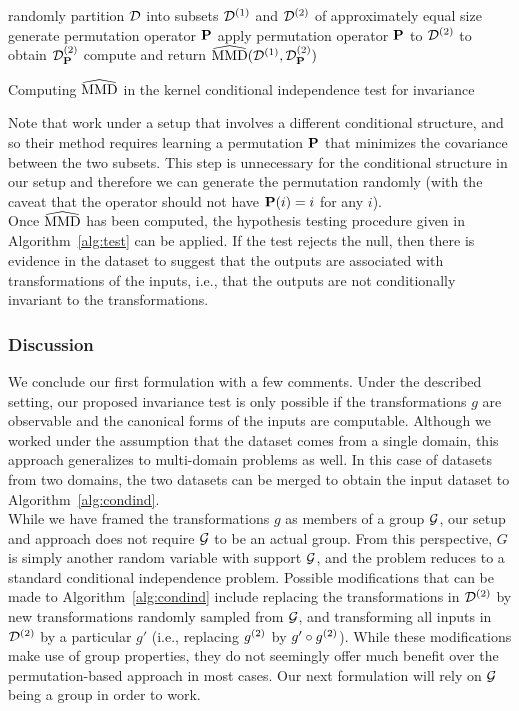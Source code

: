 \begin{algorithm}[H]
\SetAlgoLined
{}
\BlankLine
randomly partition $\mathcal{D}$ into subsets $\mathcal{D}^{(1)}$ and $\mathcal{D}^{(2)}$ of approximately equal size\;
generate permutation operator $\mathbf{P}$\;
apply permutation operator $\mathbf{P}$ to $\mathcal{D}^{(2)}$ to obtain $\mathcal{D}_{\mathbf{P}}^{(2)}$\;
compute and return $\widehat{\mathrm{MMD}}(\mathcal{D}^{(1)},\mathcal{D}_{\mathbf{P}}^{(2)})$\;
\caption{Computing $\widehat{\mathrm{MMD}}$ in the kernel conditional independence test for invariance}
\label{alg:condind}
\end{algorithm}
\vspace{1em}

Note that \textcite{Doran:2014} work under a setup that involves a different conditional structure, and so their method requires learning a permutation $\mathbf{P}$ that minimizes the covariance between the two subsets. This step is unnecessary for the conditional structure in our setup and therefore we can generate the permutation randomly (with the caveat that the operator should not have $\mathbf{P}(i)=i$ for any $i$).
\\

Once $\widehat{\mathrm{MMD}}$ has been computed, the hypothesis testing procedure given in Algorithm~\ref{alg:test} can be applied. If the test rejects the null, then there is evidence in the dataset to suggest that the outputs are associated with transformations of the inputs, i.e., that the outputs are not conditionally invariant to the transformations.

\subsubsection{Discussion}

We conclude our first formulation with a few comments. Under the described setting, our proposed invariance test is only possible if the transformations $g$ are observable and the canonical forms of the inputs are computable. Although we worked under the assumption that the dataset comes from a single domain, this approach generalizes to multi-domain problems as well. In this case of datasets from two domains, the two datasets can be merged to obtain the input dataset to Algorithm~\ref{alg:condind}.
\\

While we have framed the transformations $g$ as members of a group $\mathcal{G}$, our setup and approach does not require $\mathcal{G}$ to be an actual group. From this perspective, $G$ is simply another random variable with support $\mathcal{G}$, and the problem reduces to a standard conditional independence problem. Possible modifications that can be made to Algorithm~\ref{alg:condind} include replacing the transformations in $\mathcal{D}^{(2)}$ by new transformations randomly sampled from $\mathcal{G}$, and transforming all inputs in $\mathcal{D}^{(2)}$ by a particular $g'$ (i.e., replacing $g^{(2)}$ by $g'\circ g^{(2)}$). While these modifications make use of group properties, they do not seemingly offer much benefit over the permutation-based approach in most cases. Our next formulation will rely on $\mathcal{G}$ being a group in order to work.


